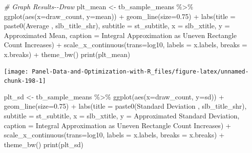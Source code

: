 \documentclass[
]{book}
\newenvironment{Shaded}{\begin{snugshade}}{\end{snugshade}}
\newcommand{\AttributeTok}[1]{\textcolor[rgb]{0.77,0.63,0.00}{#1}}
\newcommand{\CommentTok}[1]{\textcolor[rgb]{0.56,0.35,0.01}{\textit{#1}}}
\newcommand{\FloatTok}[1]{\textcolor[rgb]{0.00,0.00,0.81}{#1}}
\newcommand{\FunctionTok}[1]{\textcolor[rgb]{0.00,0.00,0.00}{#1}}
\newcommand{\NormalTok}[1]{#1}
\newcommand{\OtherTok}[1]{\textcolor[rgb]{0.56,0.35,0.01}{#1}}
\newcommand{\SpecialCharTok}[1]{\textcolor[rgb]{0.00,0.00,0.00}{#1}}
\newcommand{\StringTok}[1]{\textcolor[rgb]{0.31,0.60,0.02}{#1}}
\begin{document}
\begin{Shaded}
\begin{Highlighting}[]
\CommentTok{\# Graph Results{-}{-}Draw}
\NormalTok{plt\_mean }\OtherTok{\textless{}{-}}\NormalTok{ tb\_sample\_means }\SpecialCharTok{\%\textgreater{}\%}
  \FunctionTok{ggplot}\NormalTok{(}\FunctionTok{aes}\NormalTok{(}\AttributeTok{x=}\NormalTok{draw\_count, }\AttributeTok{y=}\NormalTok{mean)) }\SpecialCharTok{+}
  \FunctionTok{geom\_line}\NormalTok{(}\AttributeTok{size=}\FloatTok{0.75}\NormalTok{) }\SpecialCharTok{+}
  \FunctionTok{labs}\NormalTok{(}\AttributeTok{title =} \FunctionTok{paste0}\NormalTok{(}\StringTok{\textquotesingle{}Average \textquotesingle{}}\NormalTok{, slb\_title\_shr),}
       \AttributeTok{subtitle =}\NormalTok{ st\_subtitle,}
       \AttributeTok{x =}\NormalTok{ slb\_xtitle,}
       \AttributeTok{y =} \StringTok{\textquotesingle{}Approximated Mean\textquotesingle{}}\NormalTok{,}
       \AttributeTok{caption =} \StringTok{\textquotesingle{}Integral Approximation as Uneven Rectangle Count Increases\textquotesingle{}}\NormalTok{) }\SpecialCharTok{+}
  \FunctionTok{scale\_x\_continuous}\NormalTok{(}\AttributeTok{trans=}\StringTok{\textquotesingle{}log10\textquotesingle{}}\NormalTok{, }\AttributeTok{labels =}\NormalTok{ x.labels, }\AttributeTok{breaks =}\NormalTok{ x.breaks) }\SpecialCharTok{+}
  \FunctionTok{theme\_bw}\NormalTok{()}
\FunctionTok{print}\NormalTok{(plt\_mean)}
\end{Highlighting}
\end{Shaded}

\begin{center}\texttt{[image: Panel-Data-and-Optimization-with-R\_files/figure-latex/unnamed-chunk-198-1]} \end{center}

\begin{Shaded}
\begin{Highlighting}[]
\NormalTok{plt\_sd }\OtherTok{\textless{}{-}}\NormalTok{ tb\_sample\_means }\SpecialCharTok{\%\textgreater{}\%}
  \FunctionTok{ggplot}\NormalTok{(}\FunctionTok{aes}\NormalTok{(}\AttributeTok{x=}\NormalTok{draw\_count, }\AttributeTok{y=}\NormalTok{sd)) }\SpecialCharTok{+}
  \FunctionTok{geom\_line}\NormalTok{(}\AttributeTok{size=}\FloatTok{0.75}\NormalTok{) }\SpecialCharTok{+}
  \FunctionTok{labs}\NormalTok{(}\AttributeTok{title =} \FunctionTok{paste0}\NormalTok{(}\StringTok{\textquotesingle{}Standard Deviation \textquotesingle{}}\NormalTok{, slb\_title\_shr),}
       \AttributeTok{subtitle =}\NormalTok{ st\_subtitle,}
       \AttributeTok{x =}\NormalTok{ slb\_xtitle,}
       \AttributeTok{y =} \StringTok{\textquotesingle{}Approximated Standard Deviation\textquotesingle{}}\NormalTok{,}
       \AttributeTok{caption =} \StringTok{\textquotesingle{}Integral Approximation as Uneven Rectangle Count Increases\textquotesingle{}}\NormalTok{) }\SpecialCharTok{+}
  \FunctionTok{scale\_x\_continuous}\NormalTok{(}\AttributeTok{trans=}\StringTok{\textquotesingle{}log10\textquotesingle{}}\NormalTok{, }\AttributeTok{labels =}\NormalTok{ x.labels, }\AttributeTok{breaks =}\NormalTok{ x.breaks) }\SpecialCharTok{+}
  \FunctionTok{theme\_bw}\NormalTok{()}
\FunctionTok{print}\NormalTok{(plt\_sd)}
\end{Highlighting}
\end{Shaded}
\end{document}
